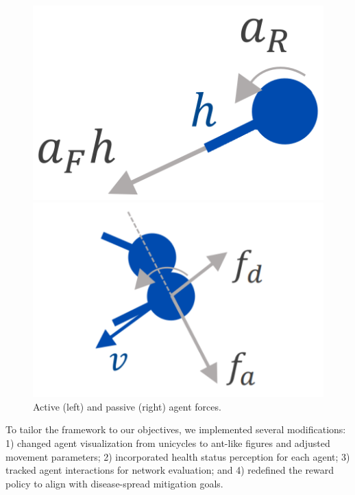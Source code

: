 \documentclass[9pt]{IEEEtran}
\begin{document}
\begin{figure}[hbt]
    \centering
    \begin{minipage}{0.2\textwidth}
        \centering
        \includegraphics[width=\textwidth]{agent_active.png}
    \end{minipage}
    \hspace{0.1cm}
    \begin{minipage}{0.25\textwidth}
        \centering
        \includegraphics[width=\textwidth]{agent_passive.png}
    \end{minipage}
    \caption{Active (left) and passive (right) agent forces. \cite{li2023predator}}
    \label{fig:main_figure}
\end{figure}

To tailor the framework to our objectives, we implemented several modifications: 1) changed agent visualization from unicycles to ant-like figures and adjusted movement parameters; 2) incorporated health status perception for each agent; 3) tracked agent interactions for network evaluation; and 4) redefined the reward policy to align with disease-spread mitigation goals.
\end{document}
